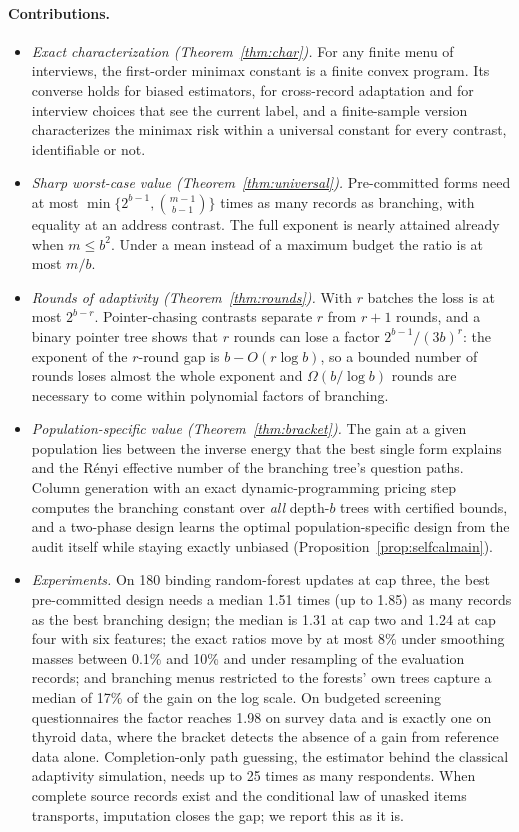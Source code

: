 \documentclass{article}
\begin{document}
\paragraph{Contributions.}
\begin{itemize}\itemsep1pt\parskip0pt
\item \emph{Exact characterization (Theorem~\ref{thm:char}).} For any finite menu of interviews, the first-order minimax constant is a finite convex program. Its converse holds for biased estimators, for cross-record adaptation and for interview choices that see the current label, and a finite-sample version characterizes the minimax risk within a universal constant for every contrast, identifiable or not.
\item \emph{Sharp worst-case value (Theorem~\ref{thm:universal}).} Pre-committed forms need at most $\min\{2^{b-1},\binom{m-1}{b-1}\}$ times as many records as branching, with equality at an address contrast. The full exponent is nearly attained already when $m\le b^2$. Under a mean instead of a maximum budget the ratio is at most $m/b$.
\item \emph{Rounds of adaptivity (Theorem~\ref{thm:rounds}).} With $r$ batches the loss is at most $2^{b-r}$. Pointer-chasing contrasts separate $r$ from $r+1$ rounds, and a binary pointer tree shows that $r$ rounds can lose a factor $2^{b-1}/(3b)^r$: the exponent of the $r$-round gap is $b-O(r\log b)$, so a bounded number of rounds loses almost the whole exponent and $\Omega(b/\log b)$ rounds are necessary to come within polynomial factors of branching.
\item \emph{Population-specific value (Theorem~\ref{thm:bracket}).} The gain at a given population lies between the inverse energy that the best single form explains and the R\'enyi effective number of the branching tree's question paths. Column generation with an exact dynamic-programming pricing step computes the branching constant over \emph{all} depth-$b$ trees with certified bounds, and a two-phase design learns the optimal population-specific design from the audit itself while staying exactly unbiased (Proposition~\ref{prop:selfcalmain}).
\item \emph{Experiments.} On 180 binding random-forest updates at cap three, the best pre-committed design needs a median 1.51 times (up to 1.85) as many records as the best branching design; the median is 1.31 at cap two and 1.24 at cap four with six features; the exact ratios move by at most 8\% under smoothing masses between 0.1\% and 10\% and under resampling of the evaluation records; and branching menus restricted to the forests' own trees capture a median of 17\% of the gain on the log scale. On budgeted screening questionnaires the factor reaches 1.98 on survey data and is exactly one on thyroid data, where the bracket detects the absence of a gain from reference data alone. Completion-only path guessing, the estimator behind the classical adaptivity simulation, needs up to 25 times as many respondents. When complete source records exist and the conditional law of unasked items transports, imputation closes the gap; we report this as it is.
\end{itemize}
\end{document}
